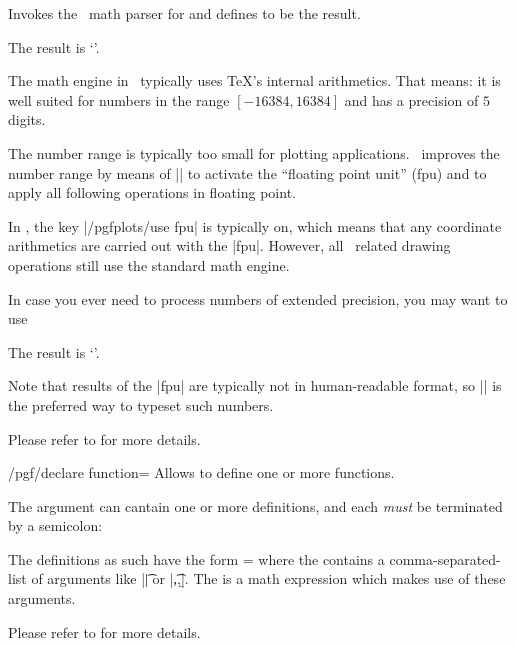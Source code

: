 \begin{command}{\pgfmathparse{}}
	Invokes the \pgfname\ math parser for  and defines \declareandlabel{\pgfmathresult} to be the result.
\begin{codeexample}[]

The result is `\pgfmathresult'.
\end{codeexample}
	\noindent The math engine in \pgfname\ typically uses \TeX's internal arithmetics. That means: it is well suited for numbers in the range $[-16384,16384]$ and has a precision of $5$ digits.

	The number range is typically too small for plotting applications. \PGFPlots\ improves the number range by means of || to activate the ``floating point unit'' (fpu) and to apply all following operations in floating point. 

	In \PGFPlots, the key |/pgfplots/use fpu| is typically on, which means that any coordinate arithmetics are carried out with the |fpu|. However, all \pgfname\ related drawing operations still use the standard math engine.

	In case you ever need to process numbers of extended precision, you may want to use
\begin{codeexample}[]
%

The result is `\pgfmathprintnumber{\pgfmathresult}'.
\end{codeexample}
	Note that results of the |fpu| are typically not in human-readable format, so |\pgfmathprintnumber| is the preferred way to typeset such numbers.

	Please refer to \cite{tikz} for more details.
\end{command}

\begin{key}{/pgf/declare function=}
	Allows to define one or more functions.

	The argument  can cantain one or more definitions, and each \emph{must} be terminated by a semicolon:
\begin{codeexample}[]
\end{codeexample}
	The definitions as such have the form  =  where the  contains a comma-separated-list of arguments like |\t| or |\t,\a,\b|. The  is a math expression which makes use of these arguments.

	Please refer to \cite{tikz} for more details.
\end{key}


